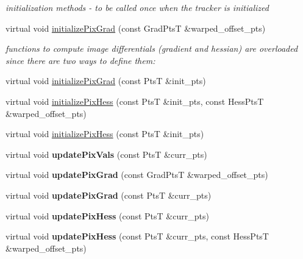 \begin{DoxyCompactItemize}
\begin{DoxyCompactList}\small\item\em initialization methods -\/ to be called once when the tracker is initialized \end{DoxyCompactList}\item 
virtual void \hyperlink{classImageBase_a2aeec772d5c4de56f4e8fbfd4f08e69d}{initialize\-Pix\-Grad} (const Grad\-Pts\-T \&warped\-\_\-offset\-\_\-pts)
\begin{DoxyCompactList}\small\item\em functions to compute image differentials (gradient and hessian) are overloaded since there are two ways to define them\-: \end{DoxyCompactList}\item 
virtual void \hyperlink{classImageBase_aa81f72f3d41e1be570b162789b8221d6}{initialize\-Pix\-Grad} (const Pts\-T \&init\-\_\-pts)
\item 
virtual void \hyperlink{classImageBase_a9e8f70830c1caffda808830f1cdf939d}{initialize\-Pix\-Hess} (const Pts\-T \&init\-\_\-pts, const Hess\-Pts\-T \&warped\-\_\-offset\-\_\-pts)
\item 
virtual void \hyperlink{classImageBase_a8ab724371b3b3874a026e530b40c4082}{initialize\-Pix\-Hess} (const Pts\-T \&init\-\_\-pts)
\item 
\hypertarget{classImageBase_a807fb84431ec6a39338a3809cd2f02bc}{virtual void {\bfseries update\-Pix\-Vals} (const Pts\-T \&curr\-\_\-pts)}\label{classImageBase_a807fb84431ec6a39338a3809cd2f02bc}

\item 
\hypertarget{classImageBase_af5d79c319b0feb05b1670289ff4c8f57}{virtual void {\bfseries update\-Pix\-Grad} (const Grad\-Pts\-T \&warped\-\_\-offset\-\_\-pts)}\label{classImageBase_af5d79c319b0feb05b1670289ff4c8f57}

\item 
\hypertarget{classImageBase_aec28bd13871be3cbfa37da46ce589f0c}{virtual void {\bfseries update\-Pix\-Grad} (const Pts\-T \&curr\-\_\-pts)}\label{classImageBase_aec28bd13871be3cbfa37da46ce589f0c}

\item 
\hypertarget{classImageBase_aaac5ac3287b29d744e6dd847e879e862}{virtual void {\bfseries update\-Pix\-Hess} (const Pts\-T \&curr\-\_\-pts)}\label{classImageBase_aaac5ac3287b29d744e6dd847e879e862}

\item 
\hypertarget{classImageBase_a155b46226f9824af99c7628ad7c33228}{virtual void {\bfseries update\-Pix\-Hess} (const Pts\-T \&curr\-\_\-pts, const Hess\-Pts\-T \&warped\-\_\-offset\-\_\-pts)}\label{classImageBase_a155b46226f9824af99c7628ad7c33228}


\end{DoxyCompactItemize}
